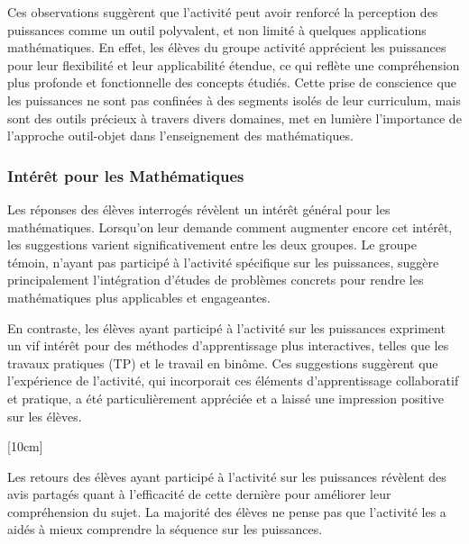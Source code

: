 \vspace*{0.5cm}

Ces observations suggèrent que l'activité peut avoir renforcé la perception des puissances comme un outil polyvalent,
et non limité à quelques applications mathématiques.
En effet,
les élèves du groupe activité apprécient les puissances pour leur flexibilité et leur applicabilité étendue,
ce qui reflète une compréhension plus profonde et fonctionnelle des concepts étudiés.
Cette prise de conscience que les puissances ne sont pas confinées à des segments isolés de leur curriculum,
mais sont des outils précieux à travers divers domaines,
met en lumière l'importance de l'approche outil-objet dans l'enseignement des mathématiques.

\subsubsection{Intérêt pour les Mathématiques}

Les réponses des élèves interrogés révèlent un intérêt général pour les mathématiques.
Lorsqu'on leur demande comment augmenter encore cet intérêt,
les suggestions varient significativement entre les deux groupes.
Le groupe témoin,
n'ayant pas participé à l'activité spécifique sur les puissances,
suggère principalement l'intégration d'études de problèmes concrets pour rendre les mathématiques plus applicables et engageantes.

\vspace*{0.5cm}

En contraste,
les élèves ayant participé à l'activité sur les puissances expriment un vif intérêt pour des méthodes d'apprentissage plus interactives,
telles que les travaux pratiques (TP) et le travail en binôme.
Ces suggestions suggèrent que l'expérience de l'activité,
qui incorporait ces éléments d'apprentissage collaboratif et pratique,
a été particulièrement appréciée et a laissé une impression positive sur les élèves.


[10cm]

Les retours des élèves ayant participé à l'activité sur les puissances révèlent des avis partagés quant à l'efficacité de cette dernière pour améliorer leur compréhension du sujet.
La majorité des élèves ne pense pas que l'activité les a aidés à mieux comprendre la séquence sur les puissances.


